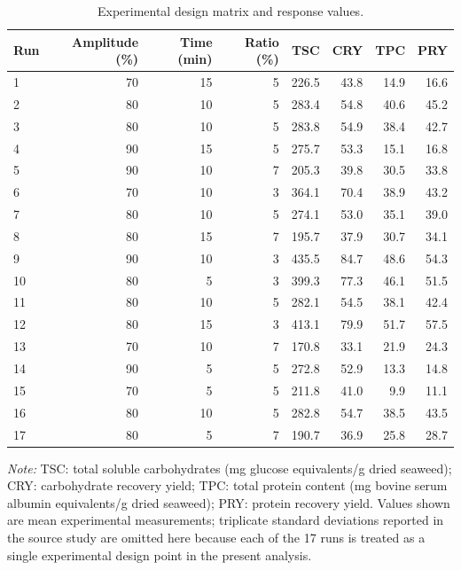\documentclass[MScDSA]{uccthesis}
\begin{document}
\begin{table}[H]
\centering
\caption{Experimental design matrix and response values.}
\label{tab:experimental_values}
\small
\begin{tabular}{lrrrrrrr}
\toprule
\textbf{Run} & \textbf{Amplitude (\%)} & \textbf{Time (min)} & \textbf{Ratio (\%)} & \textbf{TSC} & \textbf{CRY} & \textbf{TPC} & \textbf{PRY} \\
\midrule
1 & 70 & 15 & 5 & 226.5 & 43.8 & 14.9 & 16.6 \\
2 & 80 & 10 & 5 & 283.4 & 54.8 & 40.6 & 45.2 \\
3 & 80 & 10 & 5 & 283.8 & 54.9 & 38.4 & 42.7 \\
4 & 90 & 15 & 5 & 275.7 & 53.3 & 15.1 & 16.8 \\
5 & 90 & 10 & 7 & 205.3 & 39.8 & 30.5 & 33.8 \\
6 & 70 & 10 & 3 & 364.1 & 70.4 & 38.9 & 43.2 \\
7 & 80 & 10 & 5 & 274.1 & 53.0 & 35.1 & 39.0 \\
8 & 80 & 15 & 7 & 195.7 & 37.9 & 30.7 & 34.1 \\
9 & 90 & 10 & 3 & 435.5 & 84.7 & 48.6 & 54.3 \\
10 & 80 & 5 & 3 & 399.3 & 77.3 & 46.1 & 51.5 \\
11 & 80 & 10 & 5 & 282.1 & 54.5 & 38.1 & 42.4 \\
12 & 80 & 15 & 3 & 413.1 & 79.9 & 51.7 & 57.5 \\
13 & 70 & 10 & 7 & 170.8 & 33.1 & 21.9 & 24.3 \\
14 & 90 & 5 & 5 & 272.8 & 52.9 & 13.3 & 14.8 \\
15 & 70 & 5 & 5 & 211.8 & 41.0 & 9.9 & 11.1 \\
16 & 80 & 10 & 5 & 282.8 & 54.7 & 38.5 & 43.5 \\
17 & 80 & 5 & 7 & 190.7 & 36.9 & 25.8 & 28.7 \\
\bottomrule
\end{tabular}

\begin{flushleft}
\small
\textit{Note:} TSC: total soluble carbohydrates (mg glucose equivalents/g dried seaweed); CRY: carbohydrate recovery yield; TPC: total protein content (mg bovine serum albumin equivalents/g dried seaweed); PRY: protein recovery yield. Values shown are mean experimental measurements; triplicate standard deviations reported in the source study are omitted here because each of the 17 runs is treated as a single experimental design point in the present analysis.
\end{flushleft}
\end{table}
\end{document}
